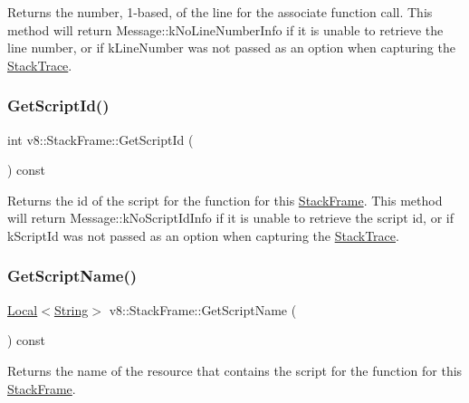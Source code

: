 Returns the number, 1-\/based, of the line for the associate function call. This method will return Message\+::k\+No\+Line\+Number\+Info if it is unable to retrieve the line number, or if k\+Line\+Number was not passed as an option when capturing the \mbox{\hyperlink{classv8_1_1StackTrace}{Stack\+Trace}}. \mbox{\label{classv8_1_1StackFrame_ac2f0f26b9c7aee860cdd613c0d83ae35}} 
\subsubsection{\texorpdfstring{Get\+Script\+Id()}{GetScriptId()}}
{\footnotesize\ttfamily int v8\+::\+Stack\+Frame\+::\+Get\+Script\+Id (\begin{DoxyParamCaption}{ }\end{DoxyParamCaption}) const}

Returns the id of the script for the function for this \mbox{\hyperlink{classv8_1_1StackFrame}{Stack\+Frame}}. This method will return Message\+::k\+No\+Script\+Id\+Info if it is unable to retrieve the script id, or if k\+Script\+Id was not passed as an option when capturing the \mbox{\hyperlink{classv8_1_1StackTrace}{Stack\+Trace}}. \mbox{\label{classv8_1_1StackFrame_a2885f14557e14c64396206b0f79daa3e}} 
\subsubsection{\texorpdfstring{Get\+Script\+Name()}{GetScriptName()}}
{\footnotesize\ttfamily \mbox{\hyperlink{classv8_1_1Local}{Local}}$<$\mbox{\hyperlink{classv8_1_1String}{String}}$>$ v8\+::\+Stack\+Frame\+::\+Get\+Script\+Name (\begin{DoxyParamCaption}{ }\end{DoxyParamCaption}) const}

Returns the name of the resource that contains the script for the function for this \mbox{\hyperlink{classv8_1_1StackFrame}{Stack\+Frame}}. \mbox{\label{classv8_1_1StackFrame_a4fbd286090b13661b3db148e0a3779b5}} 
